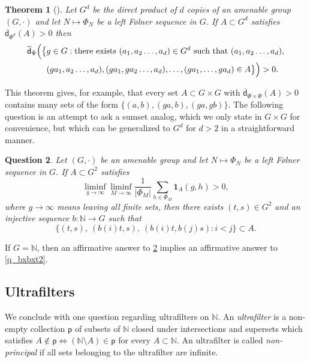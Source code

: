 \documentclass[10pt,dvipsnames]{article}
\newtheorem{theorem}{Theorem}[section]
\newtheorem{question}[theorem]{Question}
\theoremstyle{definition}
\theoremstyle{plain}
\newcommand{\N}{\mathbb{N}}
\newcommand{\udens}{\overline{\mathsf{d}}}
\newcommand{\Folner}{F\o{}lner}
\newcommand{\one}{\boldsymbol{1}}
\newcommand{\ultra}[1]{\mathsf{#1}}
\begin{document}
\begin{theorem}[{\cite[Corollary after Theorem~B]{austin2016}}]
Let $G^d$ be the direct product of $d$ copies of an amenable group $(G,\cdot)$ and let $N\mapsto \Phi_N$ be a left \Folner{} sequence in $G$.
If $A\subset G^d$ satisfies $\udens_{\Phi^d}(A)>0$ then 
\[
\begin{split}
\udens_{\Phi}\Bigl(\bigl\{& g\in G: \text{there exists } (a_1,a_2\ldots, a_d)\in G^d~\text{such that}~(a_1,a_2\ldots,a_d),
\\
&(ga_1,a_2\ldots,a_d),(ga_1,ga_2\ldots,a_d),\ldots,  (ga_1,\ldots,ga_d)\in A\bigr\}\Bigr)>0.
\end{split}
\]
\end{theorem}    


This theorem gives, for example, that every set $A \subset G \times G$ with $\udens_{\Phi \times \Phi}(A) > 0$ contains many sets of the form $\{ (a,b), (ga,b), (ga,gb) \}$. The following question is an attempt to ask a sumset analog, which we only state in $G \times G$ for convenience, but which can be generalized to $G^d$ for $d> 2$ in a straightforward manner.


\begin{question}
\label{q:amenable_cartesian}
Let $(G,\cdot)$ be an amenable group and let $N\mapsto \Phi_N$ be a left \Folner{} sequence in $G$. If $A\subset G^2$ satisfies
\begin{equation}
\label{eqn:pild2}
\liminf_{g\to\infty}
\liminf_{M\to\infty}
\dfrac{1}{|\Phi_M|} \sum_{h \in \Phi_M}
\one_A(g,h)
>0,
\end{equation}
where $g \to \infty$ means leaving all finite sets, 
then there exists $(t,s)\in G^2$ and an injective sequence $b\colon \N\to G$ such that
\[
\{(t,s),~(b(i)t,s),~(b(i)t,b(j)s): i< j\}\subset A.
\]
\end{question}

If $G=\N$,  then an affirmative answer to \cref{q:amenable_cartesian} implies an affirmative answer to \cref{q_bxbxt2}.





\subsection{Ultrafilters}

We conclude with one question regarding ultrafilters on $\N$. 
An \emph{ultrafilter} is a non-empty collection $\ultra{p}$ of subsets of $\N$ closed under intersections and supersets which satisfies $A\notin\ultra{p}\iff(\N\setminus A)\in\ultra{p}$ for every $A\subset\N$. An ultrafilter is called \emph{non-principal} if all sets belonging to the ultrafilter are infinite.
\end{document}
